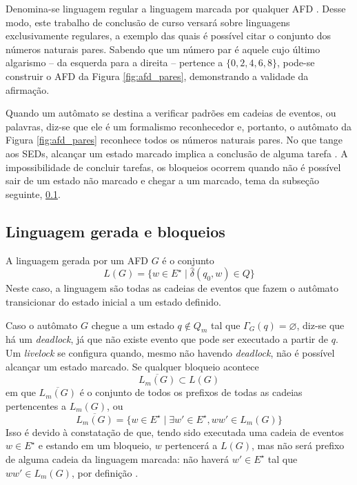 Denomina-se linguagem regular a linguagem marcada por qualquer AFD \cite{hopcroft}. Desse modo, este trabalho de conclusão de curso versará sobre linguagens exclusivamente regulares, a exemplo das quais é possível citar o conjunto dos números naturais pares. Sabendo que um número par é aquele cujo último algarismo -- da esquerda para a direita -- pertence a $\{ 0, 2, 4, 6, 8 \}$, pode-se construir o AFD da Figura \ref{fig:afd_pares}, demonstrando a validade da afirmação.


Quando um autômato se destina a verificar padrões em cadeias de eventos, ou palavras, diz-se que ele é um formalismo reconhecedor \cite{menezes} e, portanto, o autômato da Figura \ref{fig:afd_pares} reconhece todos os números naturais pares. No que tange aos \acs{SED}s, alcançar um estado marcado implica a conclusão de alguma tarefa \cite{cassandras}. A impossibilidade de concluir tarefas, os bloqueios ocorrem quando não é possível sair de um estado não marcado e chegar a um marcado, tema da subseção seguinte, \ref{subsec:ling_ger}.

\subsection{Linguagem gerada e bloqueios}
\label{subsec:ling_ger}

A linguagem gerada por um AFD $G$ é o conjunto $$L(G) = \{ w \in E^\star \mid \hat{\delta}(q_0, w) \in Q \}$$ Neste caso, a linguagem são todas as cadeias de eventos que fazem o autômato transicionar do estado inicial a um estado definido.

Caso o autômato $G$ chegue a um estado $q \not\in Q_m$ tal que $\Gamma_G(q) = \varnothing$, diz-se que há um \textit{deadlock}, já que não existe evento que pode ser executado a partir de $q$. Um \textit{livelock} se configura quando, mesmo não havendo \textit{deadlock}, não é possível alcançar um estado marcado. Se qualquer bloqueio acontece $$\overline{L_m(G)} \subset L(G)$$ em que $\overline{L_m(G)}$ é o conjunto de todos os prefixos de todas as cadeias pertencentes a $L_m(G)$, ou $$\overline{L_m(G)} = \{ w \in E^\star \mid \exists w' \in E^\star, w w' \in L_m(G) \}$$ Isso é devido à constatação de que, tendo sido executada uma cadeia de eventos $w \in E^\star$ e estando em um bloqueio, $w$ pertencerá a $L(G)$, mas não será prefixo de alguma cadeia da linguagem marcada: não haverá $w' \in E^\star$ tal que $ww' \in L_m(G)$, por definição \cite{cassandras}.

